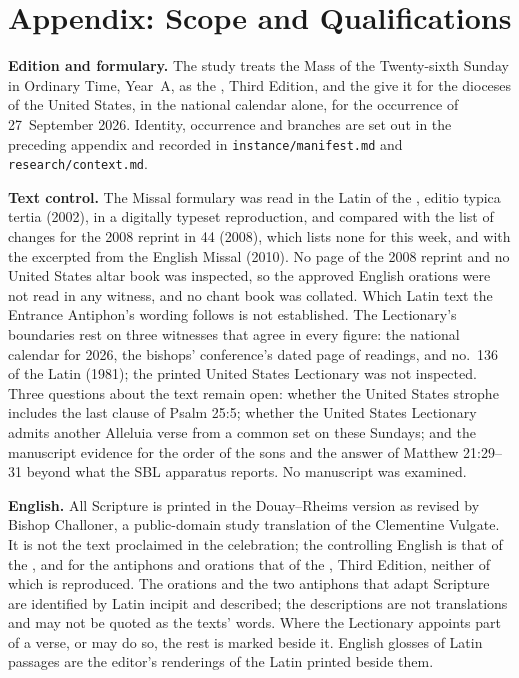 \section{Appendix: Scope and Qualifications}
\label{sec:scope}

{\small
\textbf{Edition and formulary.} The study treats the Mass of the Twenty-sixth
Sunday in Ordinary Time, Year~A, as the , Third Edition, and
the  give it for the dioceses of the United States,
in the national calendar alone, for the occurrence of 27~September 2026.
Identity, occurrence and branches are set out in the preceding appendix and
recorded in \texttt{instance/manifest.md} and \texttt{research/context.md}.

\textbf{Text control.} The Missal formulary was read in the Latin of the
, editio typica tertia (2002), in a digitally typeset
reproduction, and compared with the list of changes for the 2008 reprint in
 44 (2008), which lists none for this week, and with the
 excerpted from the English Missal (2010). No page of the 2008
reprint and no United States altar book was inspected, so the approved English
orations were not read in any witness, and no chant book was collated. Which
Latin text the Entrance Antiphon's wording follows is not established. The
Lectionary's boundaries rest on three witnesses that agree in every figure: the
national calendar for 2026, the bishops' conference's dated page of readings,
and no.~136 of the Latin  (1981); the printed United
States Lectionary was not inspected. Three questions about the text remain
open: whether the United States strophe includes the last clause of Psalm 25:5;
whether the United States Lectionary admits another Alleluia verse from a
common set on these Sundays; and the manuscript evidence for the order of the
sons and the answer of Matthew 21:29--31 beyond what the SBL apparatus reports.
No manuscript was examined.

\textbf{English.} All Scripture is printed in the Douay--Rheims version as
revised by Bishop Challoner, a public-domain study translation of the
Clementine Vulgate. It is not the text proclaimed in the celebration; the
controlling English is that of the , and for the antiphons and orations
that of the , Third Edition, neither of which is reproduced.
The orations and the two antiphons that adapt Scripture are identified by Latin
incipit and described; the descriptions are not translations and may not be
quoted as the texts' words. Where the Lectionary appoints part of a verse, or
may do so, the rest is marked beside it. English glosses of Latin passages
are the editor's renderings of the Latin printed beside them.

}
